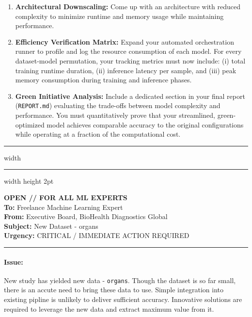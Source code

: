 \documentclass[11pt,a4paper]{article}
\begin{document}
\begin{enumerate}
    \item \textbf{Architectural Downscaling:} Come up with an architecture with reduced complexity to minimize runtime and memory usage while maintaining performance.
    \item \textbf{Efficiency Verification Matrix:} Expand your automated orchestration runner to profile and log the resource consumption of each model. For every dataset-model permutation, your tracking metrics must now include: (i) total training runtime duration, (ii) inference latency per sample, and (iii) peak memory consumption during training and inference phases.
    \item \textbf{Green Initiative Analysis:} Include a dedicated section in your final report (\texttt{REPORT.md}) evaluating the trade-offs between model complexity and performance. You must quantitatively prove that your streamlined, green-optimized model achieves comparable accuracy to the original configurations while operating at a fraction of the computational cost.
\end{enumerate}

\vspace{0.4cm}
\hrule width \hsize \kern 1mm \hrule width \hsize height 2pt 

\vspace{0.3cm}

\noindent \textbf{OPEN // FOR ALL ML EXPERTS} \\
\textbf{To:} Freelance Machine Learning Expert \\
\textbf{From:} Executive Board, BioHealth Diagnostics Global \\
\textbf{Subject:} New Dataset - organs \\
\textbf{Urgency:} CRITICAL / IMMEDIATE ACTION REQUIRED

\vspace{0.4cm}
\hrule

\paragraph{Issue:}
New study has yielded new data - \texttt{organs}. Though the dataset is so far small, there is an accute need to bring these data to use. Simple integration into existing pipline is unlikely to deliver sufficient accuracy. Innovative solutions are required to leverage the new data and extract maximum value from it.

\vspace{-0.4cm}
\end{document}
